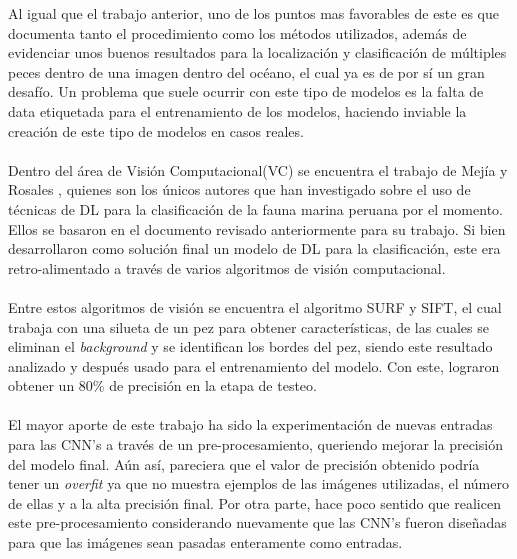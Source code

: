 Al igual que el trabajo anterior, uno de los puntos mas favorables de este es que documenta tanto el procedimiento como los métodos utilizados, además de evidenciar unos buenos resultados para la localización y clasificación de múltiples peces dentro de una imagen dentro del océano, el cual ya es de por sí un gran desafío. Un problema que suele ocurrir con este tipo de modelos es la falta de data etiquetada para el entrenamiento de los modelos, haciendo inviable la creación de este tipo de modelos en casos reales.\\\\
Dentro del área de Visión Computacional(VC) se encuentra el trabajo de Mejía y Rosales \cite{20.500.12724/11174}, quienes son los únicos autores que han investigado sobre el uso de técnicas de DL para la clasificación de la fauna marina peruana por el momento. Ellos se basaron en el documento revisado anteriormente para su trabajo. Si bien desarrollaron como solución final un modelo de DL para la clasificación, este era retro-alimentado a través de varios algoritmos de visión computacional.\\\\ 
Entre estos algoritmos de visión se encuentra el algoritmo SURF y SIFT, el cual trabaja con una silueta de un pez para obtener características, de las cuales se eliminan el \textit{background} y se identifican los bordes del pez, siendo este resultado analizado y después usado para el entrenamiento del modelo. Con este, lograron obtener un 80\% de precisión en la etapa de testeo.\\\\ 
El mayor aporte de este trabajo ha sido la experimentación de nuevas entradas para las CNN's a través de un pre-procesamiento, queriendo mejorar la precisión del modelo final. Aún así, pareciera que el valor de precisión obtenido podría tener un \textit{overfit} ya que no muestra ejemplos de las imágenes utilizadas, el número de ellas y a la alta precisión final. Por otra parte, hace poco sentido que realicen este pre-procesamiento considerando nuevamente que las CNN's fueron diseñadas para que las imágenes sean pasadas enteramente como entradas.\\\\

